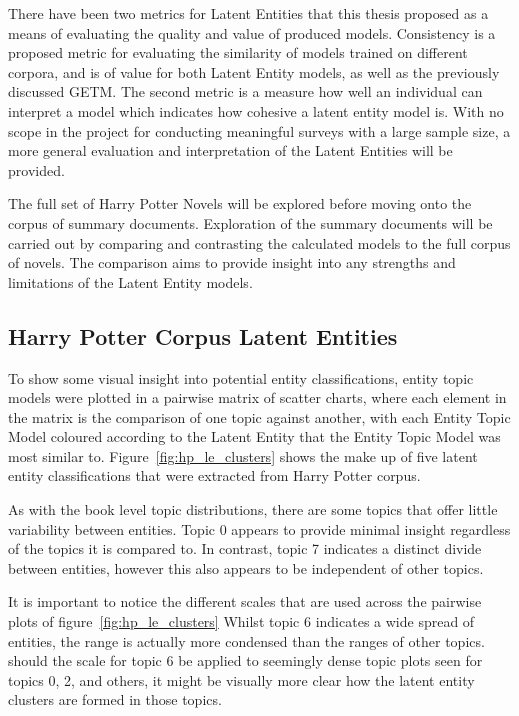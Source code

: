 \documentclass[10pt]{report}
\begin{document}
There have been two metrics for Latent Entities that this thesis proposed as a means of evaluating the quality and value of produced models. Consistency is a proposed metric for evaluating the similarity of models trained on different corpora, and is of value for both Latent Entity models, as well as the previously discussed GETM. The second metric is a measure how well an individual can interpret a model which indicates how cohesive a latent entity model is. With no scope in the project for conducting meaningful surveys with a large sample size, a more general evaluation and interpretation of the Latent Entities will be provided.

The full set of Harry Potter Novels will be explored before moving onto the corpus of summary documents. Exploration of the summary documents will be carried out by comparing and contrasting the calculated models to the full corpus of novels. The comparison aims to provide insight into any strengths and limitations of the Latent Entity models.

\subsection{Harry Potter Corpus Latent Entities}
To show some visual insight into potential entity classifications, entity topic models were plotted in a pairwise matrix of scatter charts, where each element in the matrix is the comparison of one topic against another, with each Entity Topic Model coloured according to the Latent Entity that the Entity Topic Model was most similar to. Figure~\ref{fig:hp_le_clusters} shows the make up of five latent entity classifications that were extracted from Harry Potter corpus.

As with the book level topic distributions, there are some topics that offer little variability between entities. Topic 0 appears to provide minimal insight regardless of the topics it is compared to. In contrast, topic 7 indicates a distinct divide between entities, however this also appears to be independent of other topics.

It is important to notice the different scales that are used across the pairwise plots of figure~\ref{fig:hp_le_clusters} Whilst topic 6 indicates a wide spread of entities, the range is actually more condensed than the ranges of other topics. should the scale for topic 6 be applied to seemingly dense topic plots seen for topics 0, 2, and others, it might be visually more clear how the latent entity clusters are formed in those topics.
\end{document}

